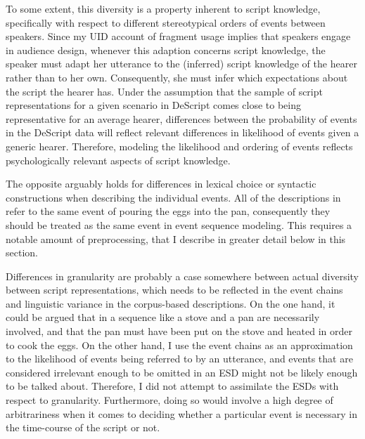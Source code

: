 To some extent, this diversity is a property inherent to script knowledge, specifically with respect to different stereotypical orders of events between speakers. Since my UID account of fragment usage implies that speakers engage in audience design, whenever this adaption concerns script knowledge, the speaker must adapt her utterance to the (inferred) script knowledge of the hearer rather than to her own. Consequently, she must infer which expectations about the script the hearer has. Under the assumption that the sample of script representations for a given scenario in DeScript comes close to being representative for an average hearer, differences between the probability of events in the DeScript data will reflect relevant differences in likelihood of events given a generic hearer. Therefore, modeling the likelihood and ordering of events reflects psychologically relevant aspects of script knowledge. 

The opposite arguably holds for differences in lexical choice or syntactic constructions when describing the individual events. All of the descriptions in \Last refer to the same event of pouring the eggs into the pan, consequently they should be treated as the same event in event sequence modeling. This requires a notable amount of preprocessing, that I describe in greater detail below in this section.

Differences in granularity are probably a case somewhere between actual diversity between script representations, which needs to be reflected in the event chains and linguistic variance in the corpus-based descriptions. On the one hand, it could be argued that in a sequence like \Next a stove and a pan are necessarily involved, and that the pan must have been put on the stove and heated in order to cook the eggs. On the other hand, I use the event chains as an approximation to the likelihood of events being referred to by an utterance, and events that are considered irrelevant enough to be omitted in an ESD might not be likely enough to be talked about. Therefore, I did not attempt to assimilate the ESDs with respect to granularity. Furthermore, doing so would involve a high degree of arbitrariness when it comes to deciding whether a particular event is necessary in the time-course of the script or not. 

